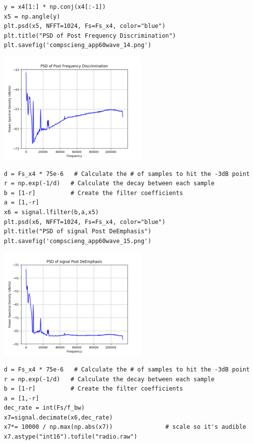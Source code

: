 \documentclass[12pt,fleqn]{article}\usepackage{../../common}
\begin{document}
\begin{verbatim}
y = x4[1:] * np.conj(x4[:-1])
x5 = np.angle(y)
plt.psd(x5, NFFT=1024, Fs=Fs_x4, color="blue")
plt.title("PSD of Post Frequency Discrimination")
plt.savefig('compscieng_app60wave_14.png')
\end{verbatim}

\includegraphics[width=20em]{compscieng_app60wave_14.png}

\begin{verbatim}
d = Fs_x4 * 75e-6   # Calculate the # of samples to hit the -3dB point
r = np.exp(-1/d)   # Calculate the decay between each sample
b = [1-r]          # Create the filter coefficients
a = [1,-r]
x6 = signal.lfilter(b,a,x5)
plt.psd(x6, NFFT=1024, Fs=Fs_x4, color="blue")
plt.title("PSD of signal Post DeEmphasis")
plt.savefig('compscieng_app60wave_15.png')
\end{verbatim}

\includegraphics[width=20em]{compscieng_app60wave_15.png}

\begin{verbatim}
d = Fs_x4 * 75e-6   # Calculate the # of samples to hit the -3dB point
r = np.exp(-1/d)   # Calculate the decay between each sample
b = [1-r]          # Create the filter coefficients
a = [1,-r]
dec_rate = int(Fs/f_bw)
x7=signal.decimate(x6,dec_rate)
x7*= 10000 / np.max(np.abs(x7))               # scale so it's audible
x7.astype("int16").tofile("radio.raw")
\end{verbatim}
\end{document}

